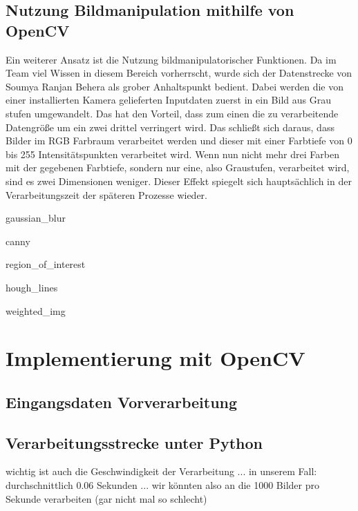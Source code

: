 \subsection{Nutzung Bildmanipulation mithilfe von OpenCV}

Ein weiterer Ansatz ist die Nutzung bildmanipulatorischer Funktionen. Da im Team viel Wissen in diesem Bereich vorherrscht, wurde sich der Datenstrecke von Soumya Ranjan Behera \cite{behera_2019} als grober Anhaltspunkt bedient.
Dabei werden die von einer installierten Kamera gelieferten Inputdaten zuerst in ein Bild aus Grau stufen umgewandelt. Das hat den Vorteil, dass zum einen die zu verarbeitende Datengröße um ein zwei drittel verringert wird. Das schließt sich daraus, dass Bilder im \ac{RGB} Farbraum verarbeitet werden und dieser mit einer Farbtiefe von 0 bis 255 Intensitätspunkten verarbeitet wird. Wenn nun nicht mehr drei Farben mit der gegebenen Farbtiefe, sondern nur eine, also Graustufen, verarbeitet wird, sind es zwei Dimensionen weniger. Dieser Effekt spiegelt sich hauptsächlich in der Verarbeitungszeit der späteren Prozesse wieder.

gaussian_blur

canny

region_of_interest

hough_lines

weighted_img



\section{Implementierung mit OpenCV} %


\subsection{Eingangsdaten Vorverarbeitung} %






\subsection{Verarbeitungsstrecke unter Python}

wichtig ist auch die Geschwindigkeit der Verarbeitung ... in unserem Fall: durchschnittlich 0.06 Sekunden ... wir könnten also an die 1000 Bilder pro Sekunde verarbeiten (gar nicht mal so schlecht)


